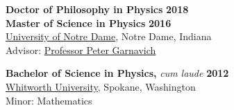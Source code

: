 \documentclass[margin]{res}
\begin{document}
\begin{resume}
{\bf Doctor of Philosophy in Physics} \hfill {\bf 2018}\\
{\bf Master of Science in Physics} \hfill  {\bf 2016}\\
\href{http://physics.nd.edu}{University of Notre Dame}, Notre Dame, Indiana \\ 
Advisor: \href{http://www.nd.edu/~pgarnavi}{Professor Peter Garnavich}



{\bf Bachelor of Science in Physics,} \textit{cum laude} \hfill \textbf{2012}\\
\href{http://www.whitworth.edu/physics/}{Whitworth University}, Spokane, Washington \\ 
Minor: Mathematics
 






\end{resume}
\end{document}
